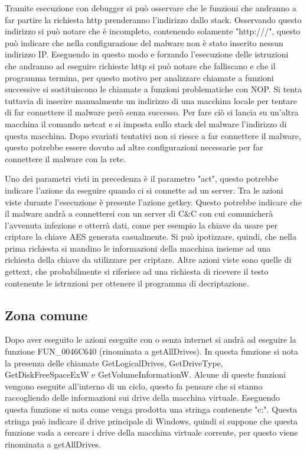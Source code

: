 \documentclass[a4paper,12pt]{article}
\begin{document}
Tramite esecuzione con debugger si può osservare  che le funzioni che andranno a far partire la richiesta http prenderanno l'indirizzo dallo stack. Osservando questo indirizzo si può notare che è incompleto, contenendo solamente "http:///", questo può indicare che nella configurazione del malware non è stato inserito nessun indirizzo IP. Eseguendo in questo modo e forzando l'esecuzione delle istruzioni che andranno ad eseguire richieste http si può notare che falliscano e che il programma termina, per questo motivo per analizzare chiamate a funzioni successive si sostituiscono le chiamate a funzioni problematiche con NOP. 
Si tenta tuttavia di inserire manualmente un indirizzo di una macchina locale per tentare di far connettere il malware però senza successo. Per fare ciò si lancia su un'altra macchina il comando netcat e si imposta sullo stack del malware l'indirizzo di questa macchina. Dopo svariati tentativi non si riesce a far connettere il malware, questo potrebbe essere dovuto ad altre configurazioni necessarie per far connettere il malware con la rete. 

Uno dei parametri visti in precedenza è il parametro "act", questo potrebbe indicare l'azione da eseguire quando ci si connette ad un server. Tra le azioni viste durante l'esecuzione è presente l'azione getkey. Questo potrebbe indicare che il malware andrà a connettersi con un server di C\&C con cui comunicherà l'avvenuta infezione e otterrà dati, come per esempio la chiave da usare per criptare la chiave AES generata casualmente. Si può ipotizzare, quindi, che nella prima richiesta si mandino le informazioni della macchina insieme ad una richiesta della chiave da utilizzare per criptare.
Altre azioni viste sono quelle di gettext, che probabilmente si riferisce ad una richiesta di ricevere il testo contenente le istruzioni per ottenere il programma di decriptazione. 

\subsection{Zona comune}
Dopo aver eseguito le azioni eseguite con o senza internet si andrà ad eseguire la funzione FUN\_0046C640 (rinominata a getAllDrives). In questa funzione si nota la presenza delle chiamate GetLogicalDrives, GetDriveType, GetDiskFreeSpaceExW e GetVolumeInformationW. Alcune di queste funzioni vengono eseguite all'interno di un ciclo, questo fa pensare che si stanno raccogliendo delle informazioni sui drive della macchina virtuale. Eseguendo questa funzione si nota come venga prodotta una stringa contenente "c:". Questa stringa può indicare il drive principale di Windows, quindi si suppone che questa funzione vada a cercare i drive della macchina virtuale corrente, per questo viene rinominata a getAllDrives.
\end{document}
